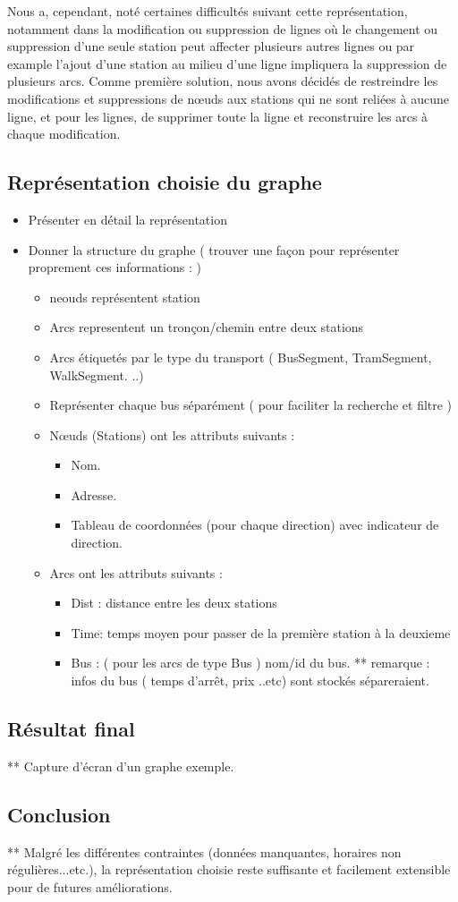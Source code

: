 \begin{itemize}
	Nous a, cependant, noté certaines difficultés suivant cette représentation, notamment dans la modification ou suppression de lignes où le changement ou suppression d'une seule station peut affecter plusieurs autres lignes ou par example l'ajout d'une station au milieu d'une ligne impliquera la suppression de plusieurs arcs.
	Comme première solution, nous avons décidés de restreindre les modifications et suppressions de nœuds aux stations qui ne sont reliées à aucune ligne, et pour les lignes, de supprimer toute la ligne et reconstruire les arcs à chaque modification.
	     
\end{itemize}
\subsection{Représentation choisie du graphe}
	\begin{itemize}
	\item Présenter en détail la représentation
	\item Donner la structure du graphe ( trouver une façon pour représenter proprement ces informations : )
	\begin{itemize}
		 \item  neouds représentent station
		 \item Arcs representent un tronçon/chemin entre deux stations
		 \item Arcs étiquetés par le type du transport ( BusSegment, TramSegment, WalkSegment. ..) 
		 \item Représenter chaque bus séparément ( pour faciliter la recherche et filtre ) 
		 \item Nœuds (Stations) ont les attributs suivants : 
		 \begin{itemize}
		 	\item Nom.
		 	\item Adresse.
		 	\item Tableau de coordonnées (pour chaque direction) avec indicateur de direction.
		 \end{itemize}
		 \item Arcs ont les attributs suivants :
		 \begin{itemize}
		 		\item Dist : distance entre les deux stations
		 		\item Time: temps moyen pour passer de la première station à la deuxieme
		 		\item Bus : ( pour les arcs de type Bus ) nom/id du bus.
		 		** remarque : infos du bus ( temps d'arrêt, prix ..etc) sont stockés sépareraient.
		 \end{itemize}
	\end{itemize}
	\end{itemize}

\subsection{Résultat final}
	** Capture d'écran d'un graphe exemple.

\subsection{Conclusion}

** Malgré les différentes contraintes (données manquantes, horaires non régulières...etc.), la représentation choisie reste suffisante et facilement extensible pour de futures améliorations.
\newpage
